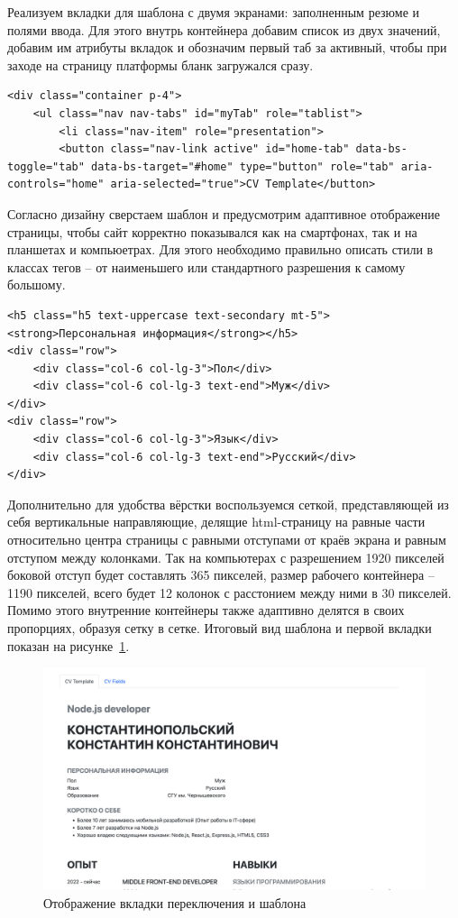 \documentclass[master, och, diploma]{SCWorks}
\begin{document}
Реализуем вкладки для шаблона с двумя экранами: заполненным резюме и полями ввода. Для этого внутрь контейнера добавим список из двух значений, добавим им атрибуты вкладок и обозначим первый таб за активный, чтобы при заходе на страницу платформы бланк загружался сразу.
\begin{verbatim}
<div class="container p-4">
    <ul class="nav nav-tabs" id="myTab" role="tablist">
        <li class="nav-item" role="presentation">
        <button class="nav-link active" id="home-tab" data-bs-toggle="tab" data-bs-target="#home" type="button" role="tab" aria-controls="home" aria-selected="true">CV Template</button>
\end{verbatim}

Согласно дизайну сверстаем шаблон и предусмотрим адаптивное отображение страницы, чтобы сайт корректно показывался как на смартфонах, так и на планшетах и компьюетрах. Для этого необходимо правильно описать стили в классах тегов – от наименьшего или стандартного разрешения к самому большому. 
\begin{verbatim}
<h5 class="h5 text-uppercase text-secondary mt-5">
<strong>Персональная информация</strong></h5>
<div class="row">
    <div class="col-6 col-lg-3">Пол</div>
    <div class="col-6 col-lg-3 text-end">Муж</div>
</div>
<div class="row">
    <div class="col-6 col-lg-3">Язык</div>
    <div class="col-6 col-lg-3 text-end">Русский</div>
</div>
\end{verbatim}

Дополнительно для удобства вёрстки воспользуемся сеткой, представляющей из себя вертикальные направляющие, делящие html-страницу на равные части относительно центра страницы с равными отступами от краёв экрана и равным отступом между колонками. Так на компьютерах с разрешением 1920 пикселей боковой отступ будет составлять 365 пикселей, размер рабочего контейнера – 1190 пикселей, всего будет 12 колонок с расстонием между ними в 30 пикселей. Помимо этого внутренние контейнеры также адаптивно делятся в своих пропорциях, образуя сетку в сетке. Итоговый вид шаблона и первой вкладки показан на рисунке~\ref{fig:22}.
\begin{figure}[!ht]
    \centering
    \includegraphics[width=12cm]{images/image23.png}
    \caption{\label{fig:22}%
        Отображение вкладки переключения и шаблона}
\end{figure}
\end{document}
